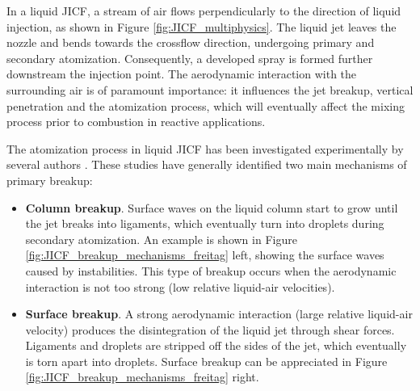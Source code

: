 In a liquid JICF, a stream of air flows perpendicularly to the direction of liquid injection, as shown in Figure \ref{fig:JICF_multiphysics}. The liquid jet leaves the nozzle and bends towards the crossflow direction, undergoing primary and secondary atomization. Consequently, a developed spray is formed further downstream the injection point. The aerodynamic interaction with the surrounding air is of paramount importance: it influences the jet breakup, vertical penetration and the atomization process, which will eventually affect the mixing process prior to combustion in reactive applications.


The atomization process in liquid JICF has been investigated experimentally by several authors . These studies have generally identified two main mechanisms of primary breakup:

\begin{itemize}

	\item \textbf{Column breakup}. Surface waves on the liquid column start to grow until the jet breaks into ligaments, which eventually turn into droplets during secondary atomization. An example is shown in Figure \ref{fig:JICF_breakup_mechanisms_freitag} left, showing the surface waves caused by instabilities. This type of breakup occurs when the aerodynamic interaction is not too strong (low relative liquid-air velocities).

\item \textbf{Surface breakup}. A strong aerodynamic interaction (large relative liquid-air velocity) produces the disintegration of the liquid jet through shear forces. Ligaments and droplets are
stripped off the sides of the jet, which eventually is torn apart into droplets. Surface breakup can be appreciated in Figure \ref{fig:JICF_breakup_mechanisms_freitag} right. 

\end{itemize}

